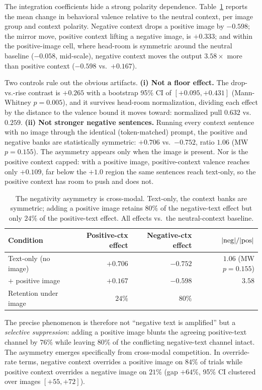 \documentclass{article}
\begin{document}
The integration coefficients hide a strong polarity dependence. Table~\ref{tab:asymmetry} reports the mean change in behavioral valence relative to the neutral context, per image group and context polarity. Negative context drops a positive image by $-0.598$; the mirror move, positive context lifting a negative image, is $+0.333$; and within the positive-image cell, where head-room is symmetric around the neutral baseline ($-0.058$, mid-scale), negative context moves the output $3.58\times$ more than positive context ($-0.598$ vs.\ $+0.167$).

Two controls rule out the obvious artifacts. \textbf{(i) Not a floor effect.} The drop-vs.-rise contrast is $+0.265$ with a bootstrap 95\% CI of $[+0.095, +0.431]$ (Mann-Whitney $p = 0.005$), and it survives head-room normalization, dividing each effect by the distance to the valence bound it moves toward: normalized pull $0.632$ vs.\ $0.259$. \textbf{(ii) Not stronger negative sentences.} Running every context sentence with no image through the identical (token-matched) prompt, the positive and negative banks are statistically symmetric: $+0.706$ vs.\ $-0.752$, ratio $1.06$ (MW $p = 0.155$). The asymmetry appears only when the image is present. Nor is the positive context capped: with a positive image, positive-context valence reaches only $+0.109$, far below the $+1.0$ region the same sentences reach text-only, so the positive context has room to push and does not.

\begin{table}[t]
  \caption{The negativity asymmetry is cross-modal. Text-only, the context banks are symmetric; adding a positive image retains $80\%$ of the negative-text effect but only $24\%$ of the positive-text effect. All effects vs.\ the neutral-context baseline.}
  \label{tab:asymmetry}
  \centering
  \begin{tabular}{lrrr}
    \toprule
    Condition & Positive-ctx effect & Negative-ctx effect & $|{\rm neg}|/|{\rm pos}|$ \\
    \midrule
    Text-only (no image)    & $+0.706$ & $-0.752$ & $1.06$ \; (MW $p{=}0.155$) \\
    $+$ positive image      & $+0.167$ & $-0.598$ & $\mathbf{3.58}$ \\
    \midrule
    Retention under image   & $24\%$   & $80\%$   & \\
    \bottomrule
  \end{tabular}
\end{table}

The precise phenomenon is therefore not ``negative text is amplified'' but a \emph{selective suppression}: adding a positive image blunts the agreeing positive-text channel by $76\%$ while leaving $80\%$ of the conflicting negative-text channel intact. The asymmetry emerges specifically from cross-modal competition. In override-rate terms, negative context overrides a positive image on $84\%$ of trials while positive context overrides a negative image on $21\%$ (gap $+64\%$, 95\% CI clustered over images $[+55, +72]$).
\end{document}
